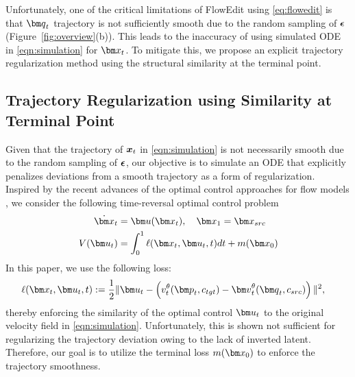 Unfortunately,  one of the critical limitations of FlowEdit using \eqref{eq:flowedit} is that
$\vq_t$ trajectory is not sufficiently smooth due to the random sampling of ${\boldsymbol \epsilon}$ (Figure~\ref{fig:overview}(b)).
 This leads to the inaccuracy of using simulated ODE in \eqref{eqn:simulation} for $\vx_t$.
To mitigate this, we propose an explicit trajectory regularization method using the structural similarity at the terminal point.

\subsection{Trajectory Regularization using Similarity at Terminal Point}

Given that the trajectory of ${\boldsymbol x}_t$ in \eqref{eqn:simulation} is not necessarily smooth due to the random sampling of ${\boldsymbol \epsilon}$, our objective is to simulate an ODE that explicitly penalizes deviations from a smooth trajectory as a form of regularization. Inspired by the recent advances of the optimal control approaches for flow models \cite{rout2025semantic, rout2025rbmodulation}, we consider the following time-reversal optimal control problem
\begin{align}
\dot\vx_t &= \vu(\vx_t),\quad \vx_1 =\vx_{src} \label{eq:ocx} \\
 V(\vu_t) &=  \int_{0}^1  \ell (\vx_t,\vu_t,t) dt + m (\vx_0) \label{eq:ocv}
\end{align}
In this paper, we use the following loss:
\begin{align}
\ell (\vx_t,\vu_t,t) & := \frac{1}{2}\|\vu_t-\left(v_t^\theta(\vp_t, c_{tgt}) - \vv_t^\theta(\vq_t, c_{src})\right)\|^2 , 
 \label{eq:ell}
\end{align}
thereby enforcing the similarity of the optimal control $\vu_t$ to the
 original velocity field in \eqref{eqn:simulation}.
 Unfortunately,  this is shown not sufficient  for regularizing the trajectory deviation owing to the lack of inverted latent.
 Therefore, our goal is to utilize the terminal loss $m(\vx_0)$ to enforce the trajectory smoothness.
 
